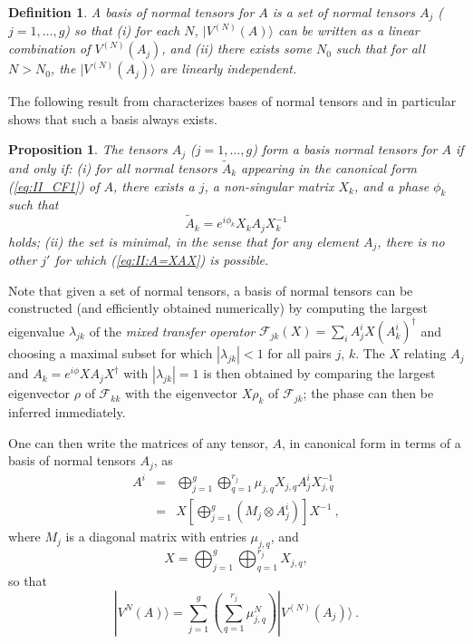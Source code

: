 \documentclass[rmp,aps,reprint,superscriptaddress,nobalancelastpage]{revtex4-1}
\newcommand{\be}{\begin{equation}}
\newcommand{\ee}{\end{equation}}
\newcommand{\bea}{\begin{eqnarray}}
\newcommand{\eea}{\end{eqnarray}}
\newtheorem{prop}[thm]{Proposition}
\newtheorem{defn}[thm]{Definition}
\newcommand{\ket}[1]{\vert#1\rangle}
\begin{document}
\begin{defn}
    \label{def:4:BNT}
    A \emph{basis of normal tensors} for $A$ is a set of normal tensors
    $A_j$ ($j=1,\ldots,g$) so that (i) for each $N$, $\ket{V^{(N)}(A)}$ can be written as a linear combination of $V^{(N)}(A_j)$, and (ii) there exists some $N_0$ such that for all $N>N_0$, the $\ket{V^{(N)}(A_j)}$ are linearly independent.
\end{defn}
The following result from \textcite{cirac:mpdo-rgfp} characterizes bases of normal tensors and in particular shows that such a basis always exists.
\begin{prop}\label{prop:char-BNT}
    The tensors $A_j$ ($j=1,\ldots,g$) form a basis normal tensors for $A$ if and only if: (i) for all normal tensors $\tilde A_k$ appearing in the canonical form (\ref{eq:II_CF1}) of $A$, there exists a $j$, a non-singular matrix $X_k$, and a phase $\phi_k$ such that
    \be
        \label{eq:II:A=XAX}
        \tilde A_k = e^{i\phi_k} X_k A_j X_k^{-1}
    \ee
    holds; (ii) the set is minimal, in the sense that for any element $A_j$, there is no other $j'$ for which (\ref{eq:II:A=XAX}) is possible.
\end{prop}
Note that given a set of normal tensors, a basis of normal tensors can be constructed (and efficiently obtained numerically) by computing the largest eigenvalue $\lambda_{jk}$ of
the \emph{mixed transfer operator}  $\mathcal F_{jk}(X)=\sum_i A_j^i X (A_k^i)^\dagger$ and choosing a maximal subset for which $|\lambda_{jk}|<1$ for all pairs $j$, $k$. The $X$ relating $A_j$ and $A_k=e^{i\phi}XA_jX^\dagger$ with $|\lambda_{jk}|=1$ is then obtained by comparing the largest eigenvector $\rho$ of $\mathcal F_{kk}$ with the eigenvector $X\rho_k$ of $\mathcal F_{jk}$; the phase can then be inferred immediately.


One can then write the matrices of any tensor, $A$, in canonical form in terms of a basis of normal tensors $A_j$, as
\begin{subequations}
    \bea
        \label{eq:II_ABasicTensors}
        A^i &=&
        \bigoplus_{j=1}^g \bigoplus_{q=1}^{r_j} \mu_{j,q} X_{j,q} A^i_j X_{j,q}^{-1}
        \\
        &=&
        X \left[\bigoplus_{j=1}^g \left(M_j \otimes A^i_j\right)\right] X^{-1} \ ,
    \eea
\end{subequations}
where $M_j$ is a diagonal matrix with entries $\mu_{j,q}$,
and
\be
    \label{eq:II_X}
    X= \bigoplus_{j=1}^g \bigoplus_{q=1}^{r_j} X_{j,q},
\ee
so that
\be
    \label{decBSV}
    |V^{N}(A)\rangle = \sum_{j=1}^g \left(\sum_{q=1}^{r_j} \mu_{j,q}^N \right) |V^{(N)}(A_j)\rangle\ .
\ee
\end{document}
